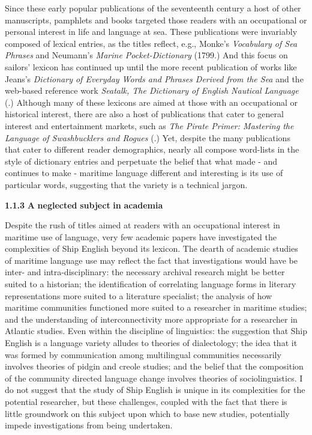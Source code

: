 \begin{styleNormali}
Since these early popular publications of the seventeenth century a host of other manuscripts, pamphlets and books targeted those readers with an occupational or personal interest in life and language at sea. These publications were invariably composed of lexical entries, as the titles reflect, e.g., Monke’s \textit{Vocabulary of Sea Phrases}  and Neumann’s \textit{Marine Pocket-Dictionary} (1799.) And this focus on sailors’ lexicon has continued up until the more recent publication of works like Jeans’s \textit{Dictionary of Everyday Words and Phrases Derived from the Sea}  and the web-based reference work \textit{Seatalk, The Dictionary of English Nautical Language} (\citealt{MacKenzie2005}.) Although many of these lexicons are aimed at those with an occupational or historical interest, there are also a host of publications that cater to general interest and entertainment markets, such as \textit{The Pirate Primer: Mastering the Language of Swashbucklers and Rogues} (\citealt{Choundas2007}.) Yet, despite the many publications that cater to different reader demographics, nearly all compose word-lists in the style of dictionary entries and perpetuate the belief that what made - and continues to make - maritime language different and interesting is its use of particular words, suggesting that the variety is a technical jargon. 
\end{styleNormali}

\begin{styleNormali}
\textbf{1.1.3} \textbf{A} \textbf{neglected} \textbf{subject} \textbf{in} \textbf{academia}
\end{styleNormali}

\begin{styleNormali}
Despite the rush of titles aimed at readers with an occupational interest in maritime use of language, very few academic papers have investigated the complexities of Ship English beyond its lexicon.  The dearth of academic studies of maritime language use may reflect the fact that investigations would have be inter- and intra-disciplinary: the necessary archival research might be better suited to a historian; the identification of correlating language forms in literary representations more suited to a literature specialist; the analysis of how maritime communities functioned more suited to a researcher in maritime studies; and the understanding of interconnectivity more appropriate for a researcher in Atlantic studies. Even within the discipline of linguistics: the suggestion that Ship English is a language variety alludes to theories of dialectology; the idea that it was formed by communication among multilingual communities necessarily involves theories of pidgin and creole studies; and the belief that the composition of the community directed language change involves theories of sociolinguistics. I do not suggest that the study of Ship English is unique in its complexities for the potential researcher, but these challenges, coupled with the fact that there is little groundwork on this subject upon which to base new studies, potentially impede investigations from being undertaken. 
\end{styleNormali}

